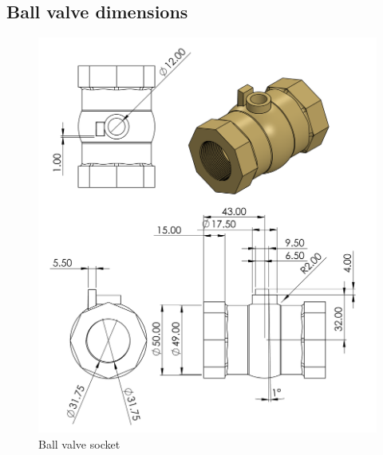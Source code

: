 \subsection{Ball valve dimensions}
    \begin{figure}[H]
        \centering
        \includegraphics[height=.8\textheight, width=\textwidth]{Figures/socket.PNG}
        \caption{Ball valve socket}
    \end{figure}

